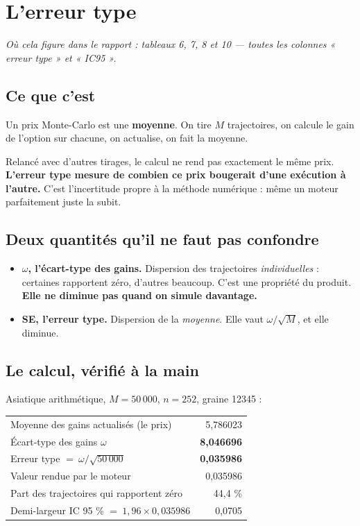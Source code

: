 \documentclass[11pt,a4paper]{article}
\newcommand{\ou}[1]{\textit{\small Où cela figure dans le rapport : #1}}
\begin{document}
\section{L'erreur type}

\ou{tableaux 6, 7, 8 et 10 --- toutes les colonnes « erreur type » et « IC95 ».}

\subsection{Ce que c'est}

Un prix Monte-Carlo est une \textbf{moyenne}. On tire $M$ trajectoires, on
calcule le gain de l'option sur chacune, on actualise, on fait la moyenne.

Relancé avec d'autres tirages, le calcul ne rend pas exactement le même prix.
\textbf{L'erreur type mesure de combien ce prix bougerait d'une exécution à
l'autre.} C'est l'incertitude propre à la méthode numérique : même un moteur
parfaitement juste la subit.

\subsection{Deux quantités qu'il ne faut pas confondre}

\begin{itemize}\setlength\itemsep{1pt}
\item \textbf{$\omega$, l'écart-type des gains.} Dispersion des trajectoires
      \emph{individuelles} : certaines rapportent zéro, d'autres beaucoup.
      C'est une propriété du produit. \textbf{Elle ne diminue pas quand on
      simule davantage.}
\item \textbf{SE, l'erreur type.} Dispersion de la \emph{moyenne}. Elle vaut
      $\omega/\sqrt{M}$, et elle diminue.
\end{itemize}

\subsection{Le calcul, vérifié à la main}

Asiatique arithmétique, $M = 50\,000$, $n = 252$, graine 12345 :

\begin{center}
\small
\begin{tabular}{lr}
\toprule
Moyenne des gains actualisés (le prix) & 5,786023 \\
Écart-type des gains $\omega$ & \textbf{8,046696} \\
Erreur type $=\ \omega/\sqrt{50\,000}$ & \textbf{0,035986} \\
Valeur rendue par le moteur & 0,035986 \\
\midrule
Part des trajectoires qui rapportent zéro & 44,4 \% \\
Demi-largeur IC 95 \% $=\ 1{,}96 \times 0{,}035986$ & 0,0705 \\
\bottomrule
\end{tabular}
\end{center}
\end{document}
